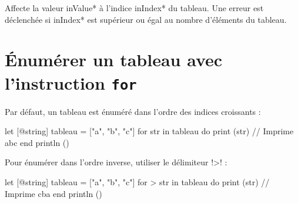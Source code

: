 Affecte la valeur \ggsq*inValue* à l'indice \ggsq*inIndex* du tableau. Une erreur est déclenchée si \ggsq*inIndex* est supérieur ou égal au nombre d'éléments du tableau.






















\section{Énumérer un tableau avec l'instruction \texttt{for}}

Par défaut, un tableau est énuméré dans l'ordre des indices croissants :

\begin{galgas4}
let [@string] tableau = ["a", "b", "c"]
for str in tableau do 
  print (str) // Imprime abc
end
println ()
\end{galgas4}

Pour énumérer dans l'ordre inverse, utiliser le délimiteur \ggsq!>! :

\begin{galgas4}
let [@string] tableau = ["a", "b", "c"]
for > str in tableau do 
  print (str) // Imprime cba
end
println ()
\end{galgas4}


